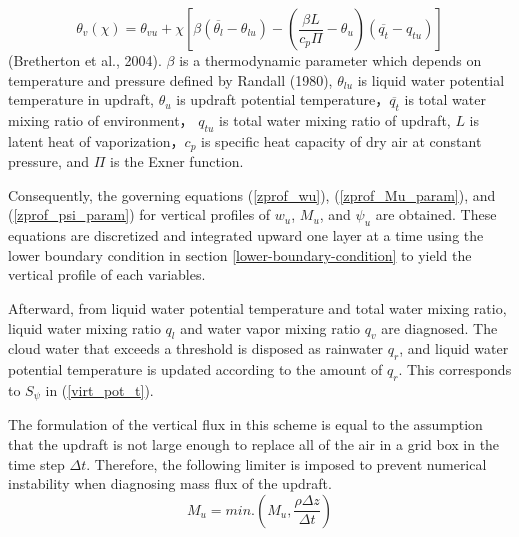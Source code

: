 \begin{equation}\label{virt_pot_t}
    \theta_v(\chi)=\theta_{vu}+\chi\left[ \beta(\overline{\theta_l}-\theta_{lu})-\left(\frac{\beta L}{c_p\Pi}-\theta_u\right)(\overline{q_t}-q_{tu})\right]   
\end{equation}
(Bretherton et al., 2004). $\beta$ is a thermodynamic parameter which depends on temperature and pressure defined by Randall (1980), 
$\theta_{lu}$ is liquid water potential temperature in updraft, $\theta_u$ is updraft potential temperature，$\overline{q_t}$ is total water mixing ratio of environment，
$q_{tu}$ is total water mixing ratio of updraft, $L$ is latent heat of vaporization，$c_p$ is specific heat capacity of dry air at constant pressure, and $\Pi$ is the Exner function.

Consequently, the governing equations (\ref{zprof_wu}), (\ref{zprof_Mu_param}), and (\ref{zprof_psi_param}) for vertical profiles of $w_u$, $M_u$, and $\psi_u$ are obtained.
These equations are discretized and integrated upward one layer at a time using the lower boundary condition in section \ref{lower-boundary-condition} to yield the vertical profile of each variables.

Afterward, from liquid water potential temperature and total water mixing ratio, liquid water mixing ratio $q_l$ and water vapor mixing ratio $q_v$ are diagnosed.
The cloud water that exceeds a threshold is disposed as rainwater $q_r$, and liquid water potential temperature is updated according to the amount of $q_r$. This corresponds to $S_\psi$ in (\ref{virt_pot_t}).

The formulation of the vertical flux in this scheme is equal to the assumption that the updraft is not large enough to replace all of the air in a grid box in the time step $\Delta t$.
Therefore, the following limiter is imposed to prevent numerical instability when diagnosing mass flux of the updraft.
\begin{equation}\label{Mu_limit}
    M_u = min.\left(M_u, \frac{\rho\Delta z}{\Delta t}\right)    
\end{equation}

